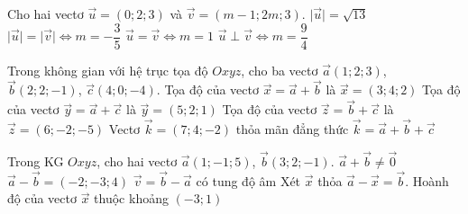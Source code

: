 \begin{ex}
	Cho hai vectơ $\vec{u}=(0;2;3)$ và $\vec{v}=(m-1;2m;3)$.
	\choiceTF
	{\True $\big|\vec{u}\big|=\sqrt{13}$}
	{$\big|\vec{u}\big|=\big|\vec{v}\big| \Leftrightarrow m=-\dfrac{3}{5}$}
	{\True $\vec{u}=\vec{v} \Leftrightarrow m=1$}
	{$\vec{u}\perp\vec{v} \Leftrightarrow m=\dfrac{9}{4}$}
\end{ex} 
\begin{ex}
	Trong không gian với hệ trục tọa độ $Oxyz$, cho ba vectơ $\vec{a}(1;2;3)$, $\vec{b}(2;2;-1)$, $\vec{c}(4;0;-4)$.
	\choiceTF
	{\True Tọa độ của vectơ $\vec{x}=\vec{a}+\vec{b}$ là $\vec{x}=(3;4;2)$}
	{Tọa độ của vectơ $\vec{y}=\vec{a}+\vec{c}$ là $\vec{y}=(5;2;1)$}
	{Tọa độ của vectơ $\vec{z}=\vec{b}+\vec{c}$ là $\vec{z}=(6;-2;-5)$}
	{\True Vectơ $\vec{k}=(7;4;-2)$ thỏa mãn đẳng thức $\vec{k}=\vec{a}+\vec{b}+\vec{c}$}
\end{ex}
\begin{ex}
	Trong KG $Oxyz$, cho hai vectơ $\vec{a}(1;-1;5)$, $\vec{b}(3;2;-1)$.
	\choiceTF
	{\True $\vec{a}+\vec{b}\ne \vec{0}$}
	{$\vec{a}-\vec{b}=(-2;-3;4)$}
	{$\vec{v}=\vec{b}-\vec{a}$ có tung độ âm}
	{\True Xét $\vec{x}$ thỏa $\vec{a}-\vec{x}=\vec{b}$. Hoành độ của vectơ $\vec{x}$ thuộc khoảng $(-3;1)$}
\end{ex}
